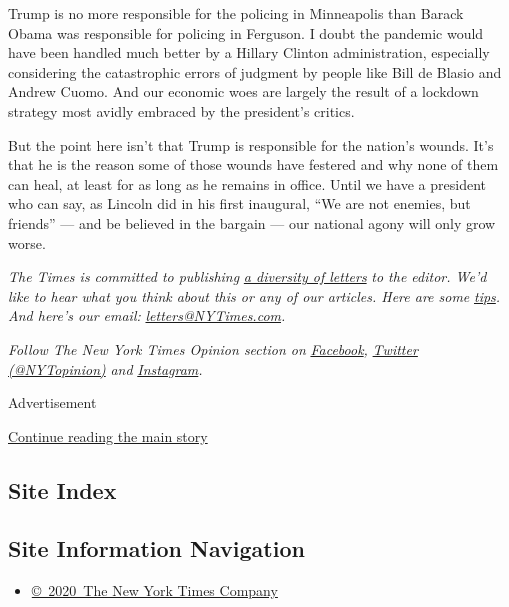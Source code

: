 Trump is no more responsible for the policing in Minneapolis than Barack
Obama was responsible for policing in Ferguson. I doubt the pandemic
would have been handled much better by a Hillary Clinton administration,
especially considering the catastrophic errors of judgment by people
like Bill de Blasio and Andrew Cuomo. And our economic woes are largely
the result of a lockdown strategy most avidly embraced by the
president's critics.

But the point here isn't that Trump is responsible for the nation's
wounds. It's that he is the reason some of those wounds have festered
and why none of them can heal, at least for as long as he remains in
office. Until we have a president who can say, as Lincoln did in his
first inaugural, ``We are not enemies, but friends'' --- and be believed
in the bargain --- our national agony will only grow worse.

\emph{The Times is committed to publishing}
\href{https://www.nytimes3xbfgragh.onion/2019/01/31/opinion/letters/letters-to-editor-new-york-times-women.html}{\emph{a
diversity of letters}} \emph{to the editor. We'd like to hear what you
think about this or any of our articles. Here are some}
\href{https://help.nytimes3xbfgragh.onion/hc/en-us/articles/115014925288-How-to-submit-a-letter-to-the-editor}{\emph{tips}}\emph{.
And here's our email:}
\href{mailto:letters@NYTimes.com}{\emph{letters@NYTimes.com}}\emph{.}

\emph{Follow The New York Times Opinion section on}
\href{https://www.facebookcorewwwi.onion/nytopinion}{\emph{Facebook}}\emph{,}
\href{http://twitter.com/NYTOpinion}{\emph{Twitter (@NYTopinion)}}
\emph{and}
\href{https://www.instagram.com/nytopinion/}{\emph{Instagram}}\emph{.}

Advertisement

\protect\hyperlink{after-bottom}{Continue reading the main story}

\hypertarget{site-index}{%
\subsection{Site Index}\label{site-index}}

\hypertarget{site-information-navigation}{%
\subsection{Site Information
Navigation}\label{site-information-navigation}}

\begin{itemize}
\tightlist
\item
  \href{https://help.nytimes3xbfgragh.onion/hc/en-us/articles/115014792127-Copyright-notice}{©~2020~The
  New York Times Company}
\end{itemize}

